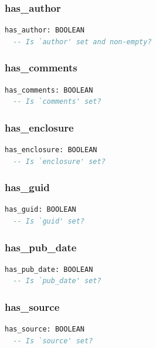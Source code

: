 \subsubsection{has\_author}

\begin{lstlisting}[language=Eiffel]
has_author: BOOLEAN
  -- Is `author' set and non-empty?
\end{lstlisting}

\subsubsection{has\_comments}

\begin{lstlisting}[language=Eiffel]
has_comments: BOOLEAN
  -- Is `comments' set?
\end{lstlisting}

\subsubsection{has\_enclosure}

\begin{lstlisting}[language=Eiffel]
has_enclosure: BOOLEAN
  -- Is `enclosure' set?
\end{lstlisting}

\subsubsection{has\_guid}

\begin{lstlisting}[language=Eiffel]
has_guid: BOOLEAN
  -- Is `guid' set?
\end{lstlisting}

\subsubsection{has\_pub\_date}

\begin{lstlisting}[language=Eiffel]
has_pub_date: BOOLEAN
  -- Is `pub_date' set?
\end{lstlisting}

\subsubsection{has\_source}

\begin{lstlisting}[language=Eiffel]
has_source: BOOLEAN
  -- Is `source' set?
\end{lstlisting}

